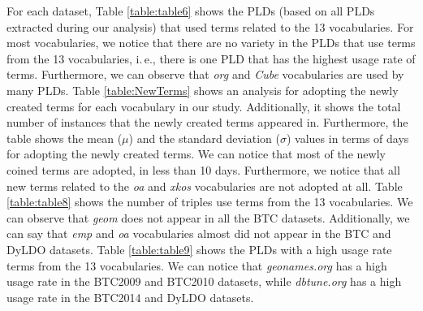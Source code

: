 
For each dataset, Table \ref{table:table6} shows the PLDs (based on all PLDs extracted during our analysis) that used terms related to the 13 vocabularies. 
For most vocabularies, we notice that there are no variety in the PLDs that use terms from the 13 vocabularies, i.\,e., there is one PLD that has the highest usage rate of terms. Furthermore, we can observe that \textit{org} and \textit{Cube} vocabularies are used by many PLDs.
%
Table \ref{table:NewTerms} shows an analysis for adopting the newly created terms for each vocabulary in our study. Additionally, it shows the total number of instances that the newly created terms appeared in. Furthermore, the table shows the mean ($\mu$) and the standard deviation ($\sigma$) values in terms of days for adopting the newly created terms. We can notice that most of the newly coined terms are adopted, in less than 10 days. Furthermore, we notice that all new terms related to the \textit{oa} and \textit{xkos} vocabularies are not adopted at all.
%
Table \ref{table:table8} shows the number of triples use terms from the 13 vocabularies. We can observe that \textit{geom} does not appear in all the BTC datasets. Additionally, we can say that \textit{emp} and \textit{oa} vocabularies almost did not appear in the BTC and DyLDO datasets.
%
Table \ref{table:table9} shows the PLDs with a high usage rate terms from the 13 vocabularies. We can notice that \textit{geonames.org} has a high usage rate in the BTC2009 and BTC2010 datasets, while \textit{dbtune.org} has a high usage rate in the BTC2014 and DyLDO datasets.

